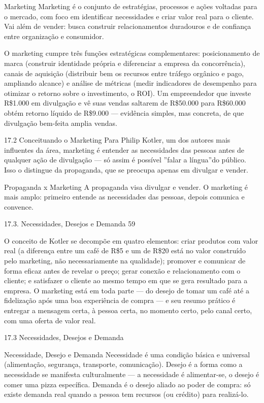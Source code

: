 Marketing Marketing é o conjunto de estratégias, processos e ações voltadas para o mercado, com foco em identificar necessidades e criar valor real para o cliente. Vai além de vender: busca construir relacionamentos duradouros e de confiança entre organização e consumidor.

O marketing cumpre três funções estratégicas complementares: posicionamento de marca (construir identidade própria e diferenciar a empresa da concorrência), canais de aquisição (distribuir bem os recursos entre tráfego orgânico e pago, ampliando alcance) e análise de métricas (medir indicadores de desempenho para otimizar o retorno sobre o investimento, o ROI). Um empreendedor que investe R\$1.000 em divulgação e vê suas vendas saltarem de R\$50.000 para R\$60.000 obtém retorno líquido de R\$9.000 — evidência simples, mas concreta, de que divulgação bem-feita amplia vendas.

17.2 Conceituando o Marketing Para Philip Kotler, um dos autores mais influentes da área, marketing é entender as necessidades das pessoas antes de qualquer ação de divulgação — só assim é possível ”falar a língua”do público. Isso o distingue da propaganda, que se preocupa apenas em divulgar e vender.

Propaganda x Marketing A propaganda visa divulgar e vender. O marketing é mais amplo: primeiro entende as necessidades das pessoas, depois comunica e convence.

17.3. Necessidades, Desejos e Demanda 59

O conceito de Kotler se decompõe em quatro elementos: criar produtos com valor real (a diferença entre um café de R\$5 e um de R\$20 está no valor construído pelo marketing, não necessariamente na qualidade); promover e comunicar de forma eficaz antes de revelar o preço; gerar conexão e relacionamento com o cliente; e satisfazer o cliente ao mesmo tempo em que se gera resultado para a empresa. O marketing está em toda parte — do desejo de tomar um café até a fidelização após uma boa experiência de compra — e seu resumo prático é entregar a mensagem certa, à pessoa certa, no momento certo, pelo canal certo, com uma oferta de valor real.

17.3 Necessidades, Desejos e Demanda

Necessidade, Desejo e Demanda Necessidade é uma condição básica e universal (alimentação, segurança, transporte, comunicação). Desejo é a forma como a necessidade se manifesta culturalmente — a necessidade é alimentar-se, o desejo é comer uma pizza específica. Demanda é o desejo aliado ao poder de compra: só existe demanda real quando a pessoa tem recursos (ou crédito) para realizá-lo.

